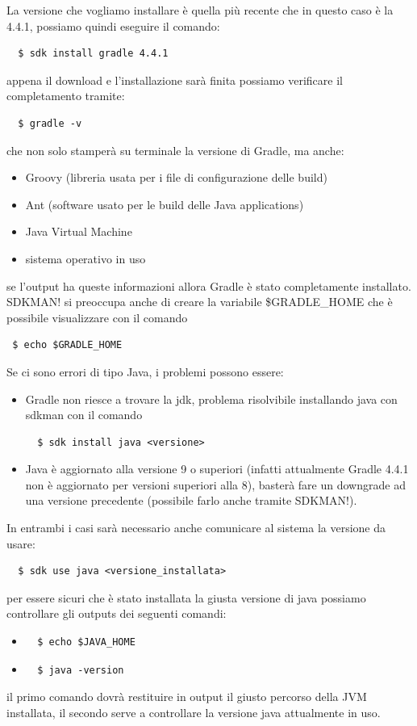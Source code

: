 \documentclass{article}
\begin{document}
\begin{flushleft}
La versione che vogliamo installare è quella più recente che in questo caso è la 4.4.1, possiamo quindi eseguire il comando:
\begin{verbatim}
  $ sdk install gradle 4.4.1
\end{verbatim}
appena il download e l'installazione sarà finita possiamo verificare il completamento tramite:
\begin{verbatim}
  $ gradle -v
\end{verbatim}
che non solo stamperà su terminale la versione di Gradle, ma anche:
\begin{itemize}
  \item Groovy (libreria usata per i file di configurazione delle build)
  \item Ant (software usato per le build delle Java applications)
  \item Java Virtual Machine
  \item sistema operativo in uso
\end{itemize}
se l'output ha queste informazioni allora Gradle è stato completamente installato. SDKMAN! si preoccupa anche di creare la variabile \$GRADLE\_HOME che è possibile visualizzare con il comando \begin{verbatim} $ echo $GRADLE_HOME \end{verbatim} Se ci sono errori di tipo Java, i problemi possono essere:
\begin{itemize}
  \item Gradle non riesce a trovare la jdk, problema risolvibile installando java con sdkman con il comando \begin{verbatim}  $ sdk install java <versione> \end{verbatim}
  \item Java è aggiornato alla versione 9 o superiori (infatti attualmente Gradle 4.4.1 non è aggiornato per versioni superiori alla 8), basterà fare un downgrade ad una versione precedente (possibile farlo anche tramite SDKMAN!).
\end{itemize}
In entrambi i casi sarà necessario anche comunicare al sistema la versione da usare: \begin{verbatim}  $ sdk use java <versione_installata> \end{verbatim} per essere sicuri che è stato installata la giusta versione di java possiamo controllare gli outputs dei seguenti comandi:
\begin{itemize}
  \item \begin{verbatim}  $ echo $JAVA_HOME \end{verbatim}
  \item \begin{verbatim}  $ java -version \end{verbatim}
\end{itemize}
il primo comando dovrà restituire in output il giusto percorso della JVM installata, il secondo serve a controllare la versione java attualmente in uso.



\end{flushleft}
\end{document}
